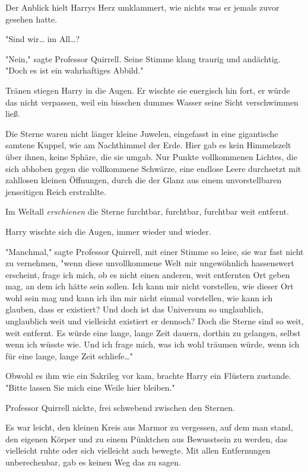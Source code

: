 {Der Anblick hielt Harrys Herz umklammert, wie nichts was er jemals zuvor gesehen hatte.

"Sind wir… im All…?

"Nein," sagte Professor Quirrell. Seine Stimme klang traurig und andächtig. "Doch es ist ein wahrhaftiges Abbild."

Tränen stiegen Harry in die Augen. Er wischte sie energisch hin fort, er würde das nicht verpassen, weil ein bisschen dummes Wasser seine Sicht verschwimmen ließ.

Die Sterne waren nicht länger kleine Juwelen, eingefasst in eine gigantische samtene Kuppel, wie am Nachthimmel der Erde. Hier gab es kein Himmelszelt über ihnen, keine Sphäre, die sie umgab. Nur Punkte vollkommenen Lichtes, die sich abhoben gegen die vollkommene Schwärze, eine endlose Leere durchsetzt mit zahllosen kleinen Öffnungen, durch die der Glanz aus einem unvorstellbaren jenseitigen Reich erstrahlte.

Im Weltall \emph{erschienen} die Sterne furchtbar, furchtbar, furchtbar weit entfernt.

Harry wischte sich die Augen, immer wieder und wieder.

"Manchmal," sagte Professor Quirrell, mit einer Stimme so leise, sie war fast nicht zu vernehmen, "wenn diese unvollkommene Welt mir ungewöhnlich hassenswert erscheint, frage ich mich, ob es nicht einen anderen, weit entfernten Ort geben mag, an dem ich hätte sein sollen. Ich kann mir nicht vorstellen, wie dieser Ort wohl sein mag und kann ich ihn mir nicht einmal vorstellen, wie kann ich glauben, dass er existiert? Und doch ist das Universum so unglaublich, unglaublich weit und vielleicht existiert er dennoch? Doch die Sterne sind so weit, weit entfernt. Es würde eine lange, lange Zeit dauern, dorthin zu gelangen, selbst wenn ich wüsste wie. Und ich frage mich, was ich wohl träumen würde, wenn ich für eine lange, lange Zeit schliefe…"

Obwohl es ihm wie ein Sakrileg vor kam, brachte Harry ein Flüstern zustande. "Bitte lassen Sie mich eine Weile hier bleiben."

Professor Quirrell nickte, frei schwebend zwischen den Sternen.

Es war leicht, den kleinen Kreis aus Marmor zu vergessen, auf dem man stand, den eigenen Körper und zu einem Pünktchen aus Bewusstsein zu werden, das vielleicht ruhte oder sich vielleicht auch bewegte. Mit allen Entfernungen unberechenbar, gab es keinen Weg das zu sagen.

}
